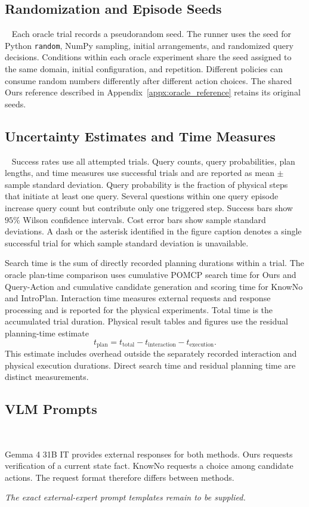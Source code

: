 \subsection{Randomization and Episode Seeds}~\label{appx:randomization}
Each oracle trial records a pseudorandom seed. The runner uses the seed for Python \texttt{random}, NumPy sampling, initial arrangements, and randomized query decisions. Conditions within each oracle experiment share the seed assigned to the same domain, initial configuration, and repetition. Different policies can consume random numbers differently after different action choices. The shared Ours reference described in Appendix~\ref{appx:oracle_reference} retains its original seeds.

\subsection{Uncertainty Estimates and Time Measures}~\label{appx:metric_details}
Success rates use all attempted trials. Query counts, query probabilities, plan lengths, and time measures use successful trials and are reported as mean $\pm$ sample standard deviation. Query probability is the fraction of physical steps that initiate at least one query. Several questions within one query episode increase query count but contribute only one triggered step. Success bars show $95\%$ Wilson confidence intervals. Cost error bars show sample standard deviations. A dash or the asterisk identified in the figure caption denotes a single successful trial for which sample standard deviation is unavailable.

Search time is the sum of directly recorded planning durations within a trial. The oracle plan-time comparison uses cumulative POMCP search time for Ours and Query-Action and cumulative candidate generation and scoring time for KnowNo and IntroPlan. Interaction time measures external requests and response processing and is reported for the physical experiments. Total time is the accumulated trial duration. Physical result tables and figures use the residual planning-time estimate
\[
t_{\mathrm{plan}}=t_{\mathrm{total}}-t_{\mathrm{interaction}}-t_{\mathrm{execution}}.
\]
This estimate includes overhead outside the separately recorded interaction and physical execution durations. Direct search time and residual planning time are distinct measurements.

\subsection{VLM Prompts}~\label{appx:vlm_prompts}

Gemma 4 31B IT provides external responses for both methods. Ours requests verification of a current state fact. KnowNo requests a choice among candidate actions. The request format therefore differs between methods.

\textit{The exact external-expert prompt templates remain to be supplied.}
